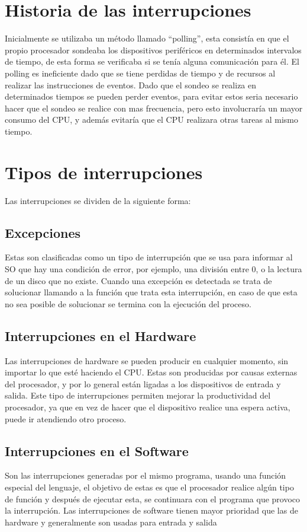 \documentclass[11pt,letterpaper]{article}
\begin{document}
\section*{Historia de las interrupciones}
Inicialmente se utilizaba un método llamado “polling”, esta consistía en que el propio procesador sondeaba los dispositivos periféricos en determinados intervalos de tiempo, de esta forma se verificaba si se tenía alguna comunicación para él.
El polling es ineficiente dado que se tiene perdidas de tiempo y de recursos al realizar las instrucciones de eventos. Dado que el sondeo se realiza en determinados tiempos se pueden perder eventos, para evitar estos seria necesario hacer que el sondeo se realice con mas frecuencia, pero esto involucraría un mayor consumo del CPU, y además evitaría que el CPU realizara otras tareas al mismo tiempo.


\section*{Tipos de interrupciones}

Las interrupciones se dividen de la siguiente forma:
\subsection{Excepciones}
Estas son clasificadas como un tipo de interrupción que se usa para informar al SO que hay una condición de error, por ejemplo, una división entre 0, o la lectura de un disco que no existe. Cuando una excepción es detectada se trata de solucionar llamando a la función que trata esta interrupción, en caso de que esta no sea posible de solucionar se termina con la ejecución del proceso.
\subsection{Interrupciones en el Hardware}
Las interrupciones de hardware se pueden producir en cualquier momento, sin importar lo que esté haciendo el CPU. Estas son producidas por causas externas del procesador, y por lo general están ligadas a los dispositivos de entrada y salida.
Este tipo de interrupciones permiten mejorar la productividad del procesador, ya que en vez de hacer que el dispositivo realice una espera activa, puede ir atendiendo otro proceso.
\subsection{Interrupciones en el Software}
Son las interrupciones generadas por el mismo programa, usando una función especial del lenguaje, el objetivo de estas es que el procesador realice algún tipo de función y después de ejecutar esta, se continuara con el programa que provoco la interrupción. Las interrupciones de software tienen mayor prioridad que las de hardware y generalmente son usadas para entrada y salida
\end{document}
